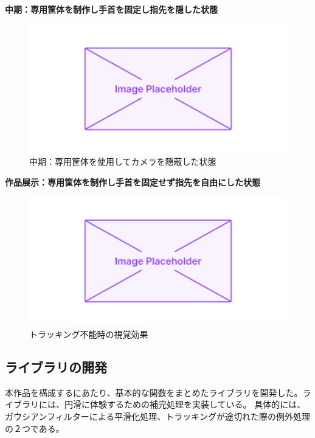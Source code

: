 \textbf{中期：専用筐体を制作し手首を固定し指先を隠した状態}
\begin{figure}[H]
  \centering
  \includegraphics[width=15cm]{img/placeholder.png}
  \caption{中期：専用筐体を使用してカメラを隠蔽した状態}
  \label{fig:kyotai_ver1}
\end{figure}

\textbf{作品展示：専用筐体を制作し手首を固定せず指先を自由にした状態}
\begin{figure}[H]
  \centering
  \includegraphics[width=15cm]{img/placeholder.png}
  \caption{トラッキング不能時の視覚効果}
  \label{fig:kyotai_ver2}
\end{figure}

\subsection{ライブラリの開発}
本作品を構成するにあたり、基本的な関数をまとめたライブラリを開発した。ライブラリには、円滑に体験するための補完処理を実装している。
具体的には、ガウシアンフィルターによる平滑化処理、トラッキングが途切れた際の例外処理の２つである。

